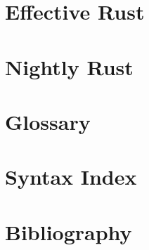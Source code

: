 \documentclass[fontsize=10pt]{scrartcl}
\begin{document}
    \pagebreak
    \section{Effective Rust}
    \label{sec:effective_rust}
    
    \pagebreak
    \section{Nightly Rust}
    \label{sec:nightly_rust}
    
    \pagebreak
    \section{Glossary}
    \label{sec:glossary}
    
    \pagebreak
    \section{Syntax Index}
    \label{sec:syntax_index}
    
    \pagebreak
    \section{Bibliography}
    \label{sec:bib}
    
\end{document}
